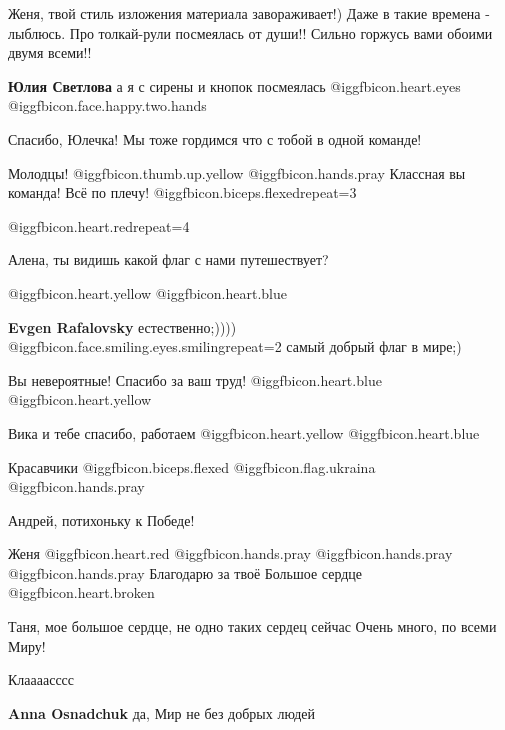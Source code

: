 \begin{itemize}

Женя, твой стиль изложения материала завораживает!) Даже в такие времена -
лыблюсь. Про толкай-рули посмеялась от души!!  Сильно горжусь вами обоими двумя
всеми!!

\begin{itemize} %
\textbf{Юлия Светлова} а я с сирены и кнопок посмеялась  @igg{fbicon.heart.eyes}  @igg{fbicon.face.happy.two.hands} 

Спасибо, Юлечка! Мы тоже гордимся что с тобой в одной команде!
\end{itemize} %

Молодцы!  @igg{fbicon.thumb.up.yellow}  @igg{fbicon.hands.pray}  Классная вы команда! Всё по плечу!  @igg{fbicon.biceps.flexed}{repeat=3} 

@igg{fbicon.heart.red}{repeat=4}

\begin{itemize} %
Алена, ты видишь какой флаг с нами путешествует?

 @igg{fbicon.heart.yellow}  @igg{fbicon.heart.blue} 

\textbf{Evgen Rafalovsky} естественно;))))  @igg{fbicon.face.smiling.eyes.smiling}{repeat=2}  самый добрый флаг в мире;)

\end{itemize} %

Вы невероятные! Спасибо за ваш труд! @igg{fbicon.heart.blue}  @igg{fbicon.heart.yellow} 

Вика и тебе спасибо, работаем  @igg{fbicon.heart.yellow}  @igg{fbicon.heart.blue} 

Красавчики  @igg{fbicon.biceps.flexed} @igg{fbicon.flag.ukraina} @igg{fbicon.hands.pray} 

Андрей, потихоньку к Победе!

Женя @igg{fbicon.heart.red} @igg{fbicon.hands.pray} @igg{fbicon.hands.pray} 
@igg{fbicon.hands.pray} Благодарю за твоё Большое сердце  @igg{fbicon.heart.broken} 

Таня, мое большое сердце, не одно таких сердец сейчас Очень много, по всеми Миру!

Клаааасссс

\textbf{Anna Osnadchuk} да, Мир не без добрых людей


\end{itemize}
